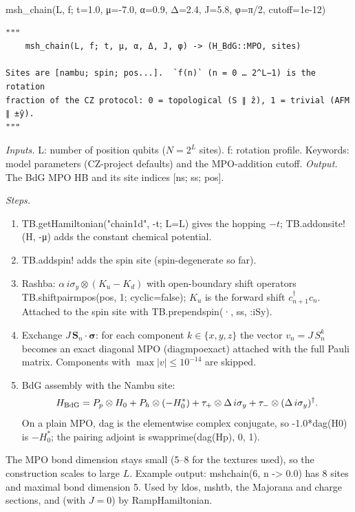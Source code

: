 \documentclass[11pt]{article}
\newcommand{\codeus}{\textunderscore\allowbreak}
\renewcommand{\code}[1]{{\ttfamily\let\_\codeus #1}}
\begin{document}
\begin{function}{msh\_chain(L, f; t=1.0, μ=-7.0, α=0.9, Δ=2.4, J=5.8, φ=π/2, cutoff=1e-12)}
\begin{Verbatim}
"""
    msh_chain(L, f; t, μ, α, Δ, J, φ) -> (H_BdG::MPO, sites)

Sites are [nambu; spin; pos...].  `f(n)` (n = 0 … 2^L−1) is the rotation
fraction of the CZ protocol: 0 = topological (S ∥ ẑ), 1 = trivial (AFM ∥ ±ŷ).
"""
\end{Verbatim}
\emph{Inputs.} \code{L}: number of position qubits ($N=2^L$ sites). \code{f}: rotation profile. Keywords: model parameters (CZ-project defaults) and the MPO-addition \code{cutoff}. \emph{Output.} The BdG MPO \code{HB} and its site indices \code{[ns; ss; pos]}.

\emph{Steps.}
\begin{enumerate}
\item \code{TB.get\_Hamiltonian("chain\_1d", -t; L=L)} gives the hopping $-t$; \code{TB.add\_onsite!(H, -μ)} adds the constant chemical potential.
\item \code{TB.add\_spin!} adds the spin site (spin-degenerate so far).
\item Rashba: $\alpha\,i\sigma_y\otimes(K_u-K_d)$ with open-boundary shift operators \code{TB.shift\_pair\_mpos(pos, 1; cyclic=false)}; $K_u$ is the forward shift $c^\dagger_{n+1}c_n$. Attached to the spin site with \code{TB.prepend\_spin(·, ss, :iSy)}.
\item Exchange $J\,\mathbf S_n\cdot\boldsymbol\sigma$: for each component $k\in\{x,y,z\}$ the vector $v_n=J\,S_n^k$ becomes an exact diagonal MPO (\code{diag\_mpo\_exact}) attached with the full Pauli matrix. Components with $\max|v|\le10^{-14}$ are skipped.
\item BdG assembly with the Nambu site:
\[
H_{\rm BdG}=P_p\otimes H_0+P_h\otimes(-H_0^*)+\tau_+\otimes\Delta\,i\sigma_y+\tau_-\otimes(\Delta\,i\sigma_y)^\dagger .
\]
On a plain MPO, \code{dag} is the elementwise complex conjugate, so \code{-1.0*dag(H0)} is $-H_0^*$; the pairing adjoint is \code{swapprime(dag(Hp), 0, 1)}.
\end{enumerate}
The MPO bond dimension stays small (5–8 for the textures used), so the construction scales to large $L$. Example output: \code{msh\_chain(6, n -> 0.0)} has 8 sites and maximal bond dimension 5. Used by \code{ldos}, \code{msh\_tb}, the Majorana and charge sections, and (with $J=0$) by \code{RampHamiltonian}.
\end{function}

\end{document}

